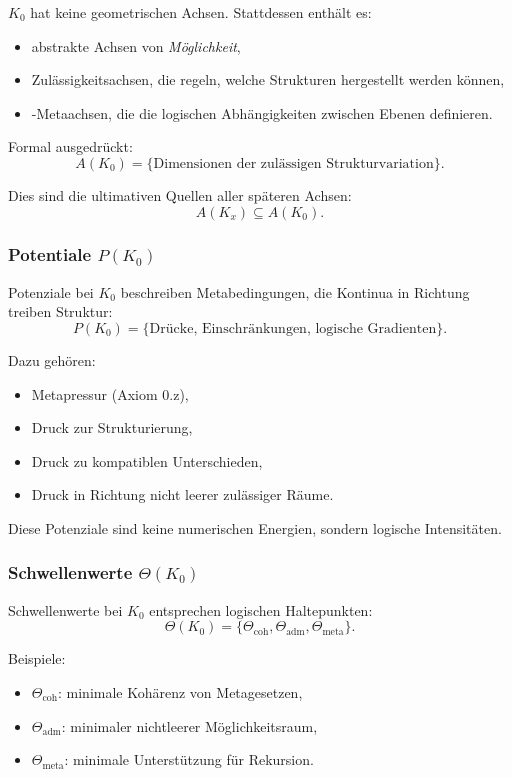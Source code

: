 $K_0$ hat keine geometrischen Achsen. Stattdessen enthält es:
\begin{itemize}
    \item abstrakte Achsen von \emph{Möglichkeit},
    \item Zulässigkeitsachsen, die regeln, welche Strukturen hergestellt werden können,
    \item-Metaachsen, die die logischen Abhängigkeiten zwischen Ebenen definieren.
\end{itemize}

Formal ausgedrückt:
\[
A(K_0) = \{ \text{Dimensionen der zulässigen Strukturvariation} \}.
\]

Dies sind die ultimativen Quellen aller späteren Achsen:
\[
A(K_x) \subseteq A(K_0).
\]

\subsubsection{Potentiale \texorpdfstring{$P(K_0)$}{P(K_0)}}

Potenziale bei $K_0$ beschreiben Metabedingungen, die Kontinua in Richtung treiben
Struktur:
\[
P(K_0) = \{ \text{Drücke, Einschränkungen, logische Gradienten} \}.
\]

Dazu gehören:
\begin{itemize}
    \item Metapressur (Axiom 0.z),
    \item Druck zur Strukturierung,
    \item Druck zu kompatiblen Unterschieden,
    \item Druck in Richtung nicht leerer zulässiger Räume.
\end{itemize}

Diese Potenziale sind keine numerischen Energien, sondern logische Intensitäten.

\subsubsection{Schwellenwerte \texorpdfstring{$\Theta(K_0)$}{\Theta(K_0)}}

Schwellenwerte bei $K_0$ entsprechen logischen Haltepunkten:
\[
\Theta(K_0) = \{ \Theta_{\mathrm{coh}}, \Theta_{\mathrm{adm}},
                 \Theta_{\mathrm{meta}} \}.
\]

Beispiele:
\begin{itemize}
    \item $\Theta_{\mathrm{coh}}$: minimale Kohärenz von Metagesetzen,
    \item $\Theta_{\mathrm{adm}}$: minimaler nichtleerer Möglichkeitsraum,
    \item $\Theta_{\mathrm{meta}}$: minimale Unterstützung für Rekursion.
\end{itemize}

